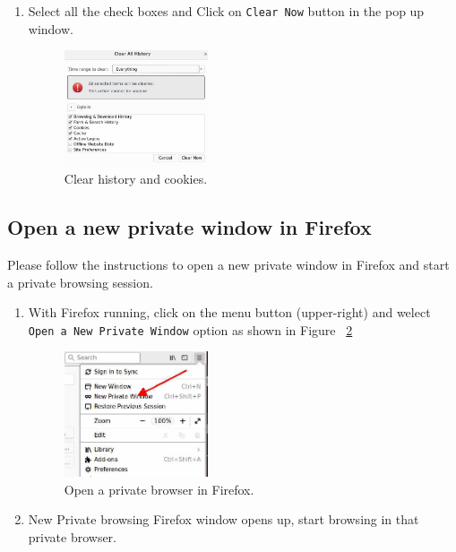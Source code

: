 \begin{enumerate}
  \item Select all the check boxes and Click on {\tt Clear Now} button in the pop up window. 
	\begin{figure}[ht]
	\centering	
	\includegraphics[width=0.4\textwidth,natwidth=621,natheight=403]{Figs/clearhistory4.jpg}
	\caption{Clear history and cookies.} 
	\label{fig:clear_history4}
	\end{figure}

\end{enumerate}
	

\subsection{Open a new private window in Firefox} 

Please follow the instructions to open a new private window in Firefox and start a private browsing session.

\begin{enumerate}
  \item With Firefox running, click on the menu button (upper-right) and welect {\tt Open a New Private Window} option as shown in Figure ~\ref{fig:private_window}

	\begin{figure}
	\centering	
	\includegraphics[width=0.4\textwidth,natwidth=621,natheight=403]{Figs/privatewindow.jpg}
	\caption{Open a private browser in Firefox.} 
	\label{fig:private_window}
	\end{figure}

  \item New Private browsing Firefox window opens up, start browsing in that private browser.


\end{enumerate}


